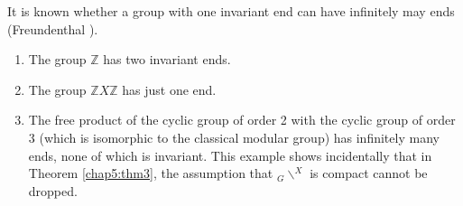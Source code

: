 \begin{remark*}
  It is known whether a group with one invariant end can have
  infinitely may ends (Freundenthal \cite{key1}). 
\end{remark*}

\begin{examples*}
  \begin{enumerate}[1)]
  \item The group $\mathbb{Z}$ has two invariant ends. 
  \item The group $\mathbb{Z} X \mathbb{Z}$ has just one end. 
  \item The free product of the cyclic group of order 2 with the
    cyclic group of order 3 (which is isomorphic to the classical
    modular group) has infinitely many ends, none of which is
    invariant. This example shows incidentally that in Theorem \ref{chap5:thm3}, the
    assumption that $_G \backslash^X$ is compact cannot be dropped.  
  \end{enumerate}
\end{examples*}
